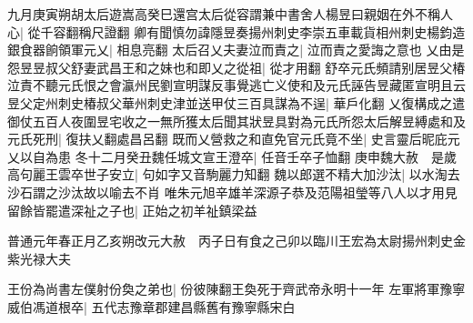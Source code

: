 九月庚寅朔胡太后遊嵩高癸巳還宫太后從容謂兼中書舍人楊昱曰親姻在外不稱人心|{
	從千容翻稱尺證翻}
卿有聞慎勿諱隱昱奏揚州刺史李崇五車載貨相州刺史楊鈞造銀食器餉領軍元乂|{
	相息亮翻}
太后召乂夫妻泣而責之|{
	泣而責之愛誨之意也}
乂由是怨昱昱叔父舒妻武昌王和之妹也和即乂之從祖|{
	從才用翻}
舒卒元氏頻請别居昱父椿泣責不聽元氏恨之會瀛州民劉宣明謀反事覺逃亡义使和及元氏誣告昱藏匿宣明且云昱父定州刺史椿叔父華州刺史津並送甲仗三百具謀為不逞|{
	華戶化翻}
乂復構成之遣御仗五百人夜圍昱宅收之一無所獲太后聞其狀昱具對為元氏所怨太后解昱縛處和及元氏死刑|{
	復扶乂翻處昌呂翻}
既而乂營救之和直免官元氏竟不坐|{
	史言靈后昵庇元乂以自為患}
冬十二月癸丑魏任城文宣王澄卒|{
	任音壬卒子恤翻}
庚申魏大赦　是歲高句麗王雲卒世子安立|{
	句如字又音駒麗力知翻}
魏以郎選不精大加沙汰|{
	以水淘去沙石謂之沙汰故以喻去不肖}
唯朱元旭辛雄羊深源子恭及范陽祖瑩等八人以才用見留餘皆罷遣深祉之子也|{
	正始之初羊祉鎮梁益}


普通元年春正月乙亥朔改元大赦　丙子日有食之己卯以臨川王宏為太尉揚州刺史金紫光禄大夫

王份為尚書左僕射份奐之弟也|{
	份彼陳翻王奐死于齊武帝永明十一年}
左軍將軍豫寧威伯馮道根卒|{
	五代志豫章郡建昌縣舊有豫寧縣宋白}


